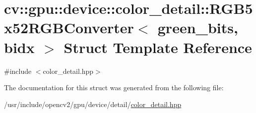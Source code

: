 \hypertarget{structcv_1_1gpu_1_1device_1_1color__detail_1_1RGB5x52RGBConverter}{\section{cv\-:\-:gpu\-:\-:device\-:\-:color\-\_\-detail\-:\-:R\-G\-B5x52\-R\-G\-B\-Converter$<$ green\-\_\-bits, bidx $>$ Struct Template Reference}
\label{structcv_1_1gpu_1_1device_1_1color__detail_1_1RGB5x52RGBConverter}
}


{\ttfamily \#include $<$color\-\_\-detail.\-hpp$>$}



The documentation for this struct was generated from the following file\-:\begin{DoxyCompactItemize}
\item 
/usr/include/opencv2/gpu/device/detail/\hyperlink{color__detail_8hpp}{color\-\_\-detail.\-hpp}\end{DoxyCompactItemize}
